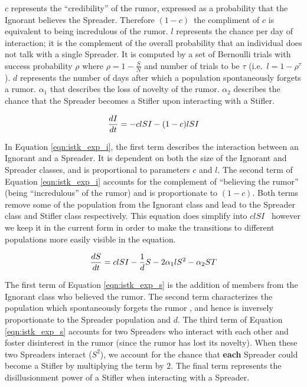$ c $ represents the ``credibility'' of the rumor, expressed as a probability that the Ignorant believes the Spreader.
Therefore $ (1 - c) $\, the compliment of $ c $ is equivalent to being incredulous of the rumor.
$ l $ represents the chance per day of interaction; it is the complement of the overall probability that an individual does not talk with a single Spreader.
It is computed by a set of Bernoulli trials with success probability $ \rho $ where $ \rho = 1 - \frac{S}{N} $ and number of trials to be $ \tau $ (i.e.~$ l = 1 - \rho^\tau $ ).
$ d $ represents the number of days after which a population spontaneously forgets a rumor.
$\alpha_1$ that describes the loss of novelty of the rumor.
$ \alpha_2 $ describes the chance that the Spreader becomes a Stifler upon interacting with a Stifler.

\begin{equation}
\label{eqn:istk_exp_i}
\frac{dI}{dt}  = - clSI - (1-c)lSI \\
\end{equation}

In Equation \ref{eqn:istk_exp_i}, the first term describes the interaction between an Ignorant and a Spreader.
It is dependent on both the size of the Ignorant and Spreader classes, and is proportional to parameters $ c $ and $ l $.
 The second term of Equation \ref{eqn:istk_exp_i} accounts for the complement of ``believing the rumor'' (being ``incredulous'' of the rumor) and is proportionate to $ (1 - c) $.
Both terms remove some of the population from the Ignorant class and lead to the Spreader class and Stifler class respectively.
This equation does simplify into $ clSI $ \, however we keep it in the current form in order to make the transitions to different populations more easily visible in the equation.

\begin{equation}
\label{eqn:istk_exp_s} \frac{dS}{dt} = clSI - \frac{1}{d} S - 2 \alpha_1l S^2 - \alpha_2 ST \\
\end{equation}

The first term of Equation \ref{eqn:istk_exp_s} is the addition of members from the Ignorant class who believed the rumor.
The second term characterizes the population which spontaneously forgets the rumor , and hence is inversely proportionate to the Spreader population and $ d $.
The third term of Equation \ref{eqn:istk_exp_s} accounts for two Spreaders who interact with each other and foster disinterest in the rumor (since the rumor has lost its novelty).
When these two Spreaders interact ($S^2$), we account for the chance that \textbf{each} Spreader could become a Stifler by multiplying the term by $ 2 $.
The final term represents the disillusionment power of a Stifler when interacting with a Spreader.

